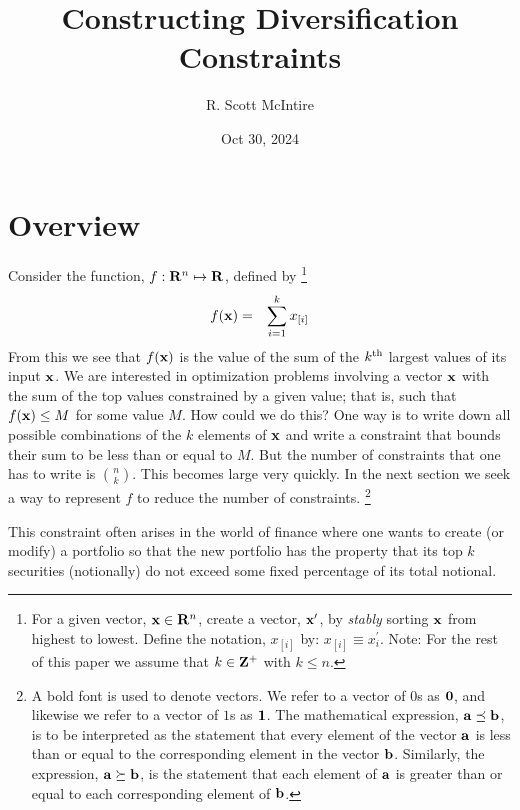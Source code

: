\documentclass[12pt]{article}
\title{Constructing Diversification Constraints}
\author{R. Scott McIntire}
\date{Oct 30, 2024}
\begin{document}
\maketitle

\section{Overview}
Consider the function, $f: {\bf R}^n \mapsto {\bf R}$, defined by%
\footnote{
For a given vector, ${\bf x} \in {\bf R}^n$, create a vector,  
${\bf x}^\prime$,
by {\it stably\/} sorting ${\bf x}$ from highest to lowest.
Define the notation, $x_{[i]}$ by: $x_{[i]} \equiv x_{i}^\prime$.
Note: For the rest of this paper we assume that $k \in {\bf Z}^+$ with $k \le n$.}
\begin{eqnarray}
	f({\bf x}) & = & \sum_{i=1}^k x_{[i]} 
\end{eqnarray}
From this we see that $f({\bf x})$ is the value of the sum of the $k^{\rm th}$ 
largest values of its input ${\bf x}$.
We are interested in optimization problems involving a vector ${\bf x}$ 
with the sum of the top values constrained by a given value; that is, 
such that $f({\bf x}) \le M$ for some value $M$.
How could we do this? One way is to write down all possible combinations of the 
$k$ elements of ${\bf x}$ and write a constraint that bounds their sum to be 
less than or equal to $M$.  But the number of constraints that one has to 
write is $n \choose k$. This becomes large very quickly. 
In the next section we seek a way to represent $f$ to 
reduce the number of constraints.%
\footnote{A bold font is used to denote vectors. We refer to a  
vector of $0$s as ${\bf 0}$, and likewise we refer to a vector of $1$s
as ${\bf 1}$. The mathematical expression, ${\bf a} \preceq {\bf b}$, is to be 
interpreted as the statement that every element of the vector ${\bf a}$ is 
less than or equal to the corresponding element in the vector ${\bf b}$. 
Similarly, the expression, ${\bf a} \succeq {\bf b}$, is the statement that 
each element of ${\bf a}$ is greater than or equal to each 
corresponding element of ${\bf b}$.
}

This constraint often arises in the world of finance where one wants to 
create (or modify) a portfolio so that the new portfolio has the property
that its top $k$ securities (notionally) do not exceed some fixed percentage 
of its total notional.
\end{document}
